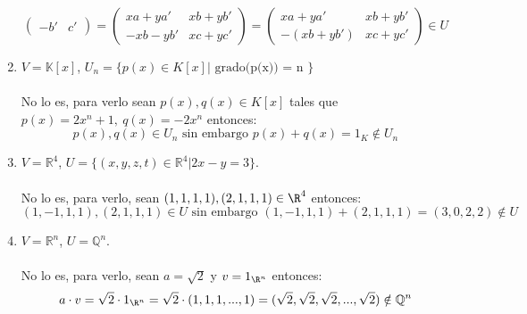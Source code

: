 \begin{ejercicio}
\begin{enumerate}[label=\alph*)]
\begin{equation*}
\begin{pmatrix}
				      -b' & c'
			      \end{pmatrix} = \begin{pmatrix}
				      xa + ya'  & xb + yb' \\
				      -xb - yb' & xc + yc'
			      \end{pmatrix} =
			      \begin{pmatrix}
				      xa + ya'   & xb + yb' \\
				      -(xb +yb') & xc + yc'
			      \end{pmatrix}\in U
		      \end{equation*}
		\item $V = \mathbb{K} [x]$, $U_n = \{ p(x) \in K[x] | \text{ grado(p(x)) = n } \}$ \\  \\ No lo es, para verlo
		      sean $p(x),q(x) \in K[x]$ tales que $ p(x)= 2x^n +1, \ q(x)=-2x^n  $ entonces:
		      \begin{equation*}
			      p(x),q(x) \in U_n \text{ sin embargo } p(x)+q(x)=1_K \notin U_n
		      \end{equation*}
		\item $V = \mathbb{R}^4$, $U = \{(x,y,z,t) \in \mathbb{R}^4 | 2x - y = 3\}$.
		      \\ \\No lo es, para verlo, sean $(1,1,1,1), (2,1,1,1) \in \R^4$ entonces:
		      \begin{equation*}
			      (1,-1,1,1), (2,1,1,1) \in U \text{ sin embargo } (1,-1,1,1)+(2,1,1,1)=(3,0,2,2) \notin U
		      \end{equation*}
		\item $V = \mathbb{R}^n$, $U = \mathbb{Q}^n$.
		      \\ \\No lo es, para verlo, sean $a = \sqrt{2}$ y $v = 1_{\R^n}$ entonces:
		      \begin{equation*}
			      a \cdot v = \sqrt{2} \cdot 1_{\R^n} = \sqrt{2} \cdot (1,1,1,...,1) = (\sqrt{2},\sqrt{2},\sqrt{2},...,\sqrt{2}) \notin \mathbb{Q}^n
		      \end{equation*}


\end{enumerate}
\end{ejercicio}
